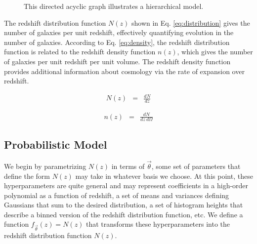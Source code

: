 \documentclass[preprint]{aastex}
\begin{document}
\begin{figure}
\vspace{0.5cm}
\begin{center}
\caption{This directed acyclic graph illustrates a hierarchical model.}
\label{fig:flow}
\end{center}
\end{figure}

The redshift distribution function $N(z)$ shown in Eq. \ref{eq:distribution} 
gives the number of galaxies per unit redshift, effectively quantifying 
evolution in the number of galaxies.  \citep{men13}  According to Eq. 
\ref{eq:density}, the redshift distribution function is related to the redshift 
density function $n(z)$, which gives the number of galaxies per unit redshift 
per unit volume.  The redshift density function provides additional information 
about cosmology via the rate of expansion over redshift.

\begin{eqnarray}
\label{eq:distribution}
N(z) &=& \frac{dN}{dz}
\end{eqnarray}

\begin{eqnarray}
\label{eq:density}
n(z) &=& \frac{dN}{dz\ d\Omega}
\end{eqnarray}

\clearpage
\subsection{Probabilistic Model}
\label{sec:prob}

We begin by parametrizing $N(z)$ in terms of $\vec{\theta}$, some set of 
parameters that define the form $N(z)$ may take in whatever basis we choose.  
At this point, these hyperparameters are quite general and may represent 
coefficients in a high-order polynomial as a function of redshift, a set of 
means and variances defining Gaussians that sum to the desired distribution, a 
set of histogram heights that describe a binned version of the redshift 
distribution function, etc.  We define a function $f_{\vec{\theta}}(z)=N(z)$ 
that transforms these hyperparameters into the redshift distribution function 
$N(z)$.
\end{document}
